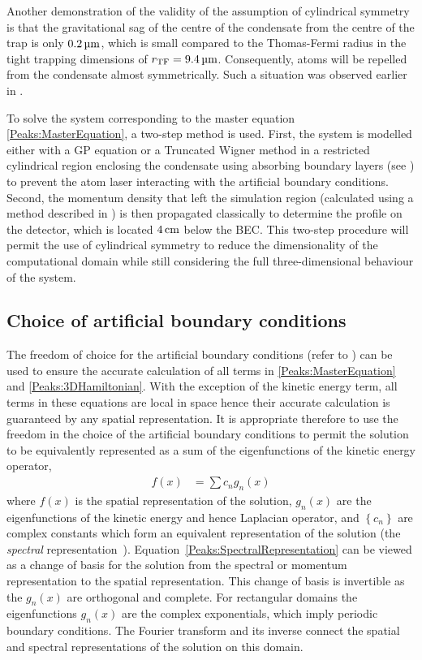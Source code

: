 Another demonstration of the validity of the assumption of cylindrical symmetry is that the gravitational sag of the centre of the condensate from the centre of the trap is only $\unit[0.2]{\micro m}$, which is small compared to the Thomas-Fermi radius in the tight trapping dimensions of $r_\text{TF} = \unit[9.4]{\micro m}$. Consequently, atoms will be repelled from the condensate almost symmetrically. Such a situation was observed earlier in .

To solve the system corresponding to the master equation \eqref{Peaks:MasterEquation}, a two-step method is used. First, the system is modelled either with a GP equation or a Truncated Wigner method in a restricted cylindrical region enclosing the condensate using absorbing boundary layers (see ) to prevent the atom laser interacting with the artificial boundary conditions. Second, the momentum density that left the simulation region (calculated using a method described in ) is then propagated classically to determine the profile on the detector, which is located $\unit[4]{cm}$ below the BEC. This two-step procedure will permit the use of cylindrical symmetry to reduce the dimensionality of the computational domain while still considering the full three-dimensional behaviour of the system.

\subsection{Choice of artificial boundary conditions}

The freedom of choice for the artificial boundary conditions (refer to ) can be used to ensure the accurate calculation of all terms in \eqref{Peaks:MasterEquation} and \eqref{Peaks:3DHamiltonian}. With the exception of the kinetic energy term, all terms in these equations are local in space hence their accurate calculation is guaranteed by any spatial representation. It is appropriate therefore to use the freedom in the choice of the artificial boundary conditions to permit the solution to be equivalently represented as a sum of the eigenfunctions of the kinetic energy operator,
\begin{align}
    \label{Peaks:SpectralRepresentation}
    f(x) &= \sum c_n g_n (x)
\end{align} 
where $f(x)$ is the spatial representation of the solution, $g_n(x)$ are the eigenfunctions of the kinetic energy and hence Laplacian operator, and $\left\{c_n\right\}$ are complex constants which form an equivalent representation of the solution (the \emph{spectral} representation~\citep{SpectralMethods}). Equation~\eqref{Peaks:SpectralRepresentation} can be viewed as a change of basis for the solution from the spectral or momentum representation to the spatial representation. This change of basis is invertible as the $g_n(x)$ are orthogonal and complete. For rectangular domains the eigenfunctions $g_n(x)$ are the complex exponentials, which imply periodic boundary conditions. The Fourier transform and its inverse connect the spatial and spectral representations of the solution on this domain.

